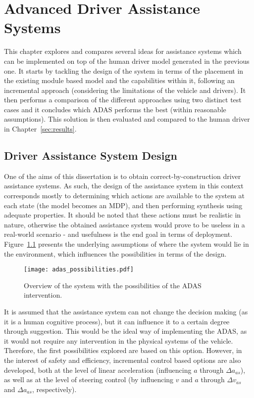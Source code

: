 \chapter{Advanced Driver Assistance Systems}
\label{sec:adas}

This chapter explores and compares several ideas for assistance systems which can be implemented on top of the human driver model generated in the previous one. It starts by tackling the design of the system in terms of the placement in the existing module based model and the capabilities within it, following an incremental approach (considering the limitations of the vehicle and drivers). It then performs a comparison of the different approaches using two distinct test cases and it concludes which ADAS performs the best (within reasonable assumptions). This solution is then evaluated and compared to the human driver in Chapter~\ref{sec:results}.

\section{Driver Assistance System Design}

One of the aims of this dissertation is to obtain correct-by-construction driver assistance systems. As such, the design of the assistance system in this context corresponds mostly to determining which actions are available to the system at each state (the model becomes an MDP), and then performing synthesis using adequate properties. It should be noted that these actions must be realistic in nature, otherwise the obtained assistance system would prove to be useless in a real-world scenario - and usefulness is the end goal in terms of deployment. Figure~\ref{fig:adas_possibilities} presents the underlying assumptions of where the system would lie in the environment, which influences the possibilities in terms of the design.

\vspace{1em}
\begin{figure}[h]
    \centering
    \texttt{[image: adas\_possibilities.pdf]}
    \caption{Overview of the system with the possibilities of the ADAS intervention.}
    \label{fig:adas_possibilities}
\end{figure}

It is assumed that the assistance system can not change the decision making (as it is a human cognitive process), but it can influence it to a certain degree through suggestion. This would be the ideal way of implementing the ADAS, as it would not require any intervention in the physical systems of the vehicle. Therefore, the first possibilities explored are based on this option. However, in the interest of safety and efficiency, incremental control based options are also developed, both at the level of linear acceleration (influencing $a$ through $\Delta a_{as}$), as well as at the level of steering control (by influencing $v$ and $a$ through $\Delta v_{as}$ and $\Delta a_{as}$, respectively). 

